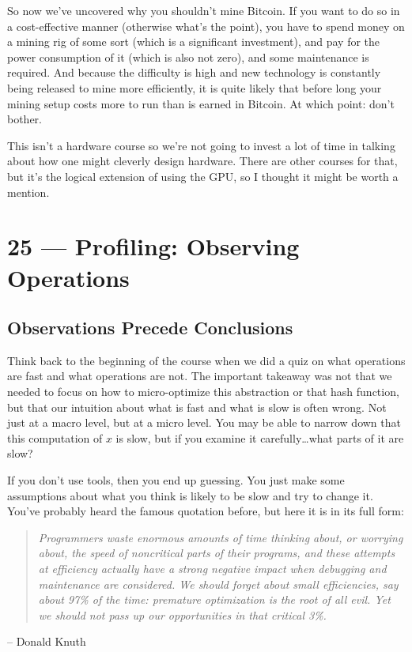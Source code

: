 \documentclass[a4paper]{report}
\begin{document}
So now we've uncovered why you shouldn't mine Bitcoin. If you want to do so in a cost-effective manner (otherwise what's the point), you have to spend money on a mining rig of some sort (which is a significant investment), and pay for the power consumption of it (which is also not zero), and some maintenance is required. And because the difficulty is high and new technology is constantly being released to mine more efficiently, it is quite likely that before long your mining setup costs more to run than is earned in Bitcoin. At which point: don't bother.

This isn't a hardware course so we're not going to invest a lot of time in talking about how one might cleverly design hardware. There are other courses for that, but it's the logical extension of using the GPU, so I thought it might be worth a mention.










\chapter*{25 --- Profiling: Observing Operations}


\section*{Observations Precede Conclusions}

Think back to the beginning of the course when we did a quiz on what operations are fast and what operations are not. The important takeaway was not that we needed to focus on how to micro-optimize this abstraction or that hash function, but that our intuition about what is fast and what is slow is often wrong. Not just at a macro level, but at a micro level. You may be able to narrow down that this computation of $x$ is slow, but if you examine it carefully\ldots what parts of it are slow?

If you don't use tools, then you end up guessing. You just make some assumptions about what you think is likely to be slow and try to change it. You've probably heard the famous quotation before, but here it is in its full form:

\begin{quote}
\textit{Programmers waste enormous amounts of time thinking about, or worrying about, the speed of noncritical parts of their programs, and these attempts at efficiency actually have a strong negative impact when debugging and maintenance are considered. We should forget about small efficiencies, say about 97\% of the time: premature optimization is the root of all evil. Yet we should not pass up our opportunities in that critical 3\%.}
\end{quote}
	\hfill -- Donald Knuth
\end{document}
